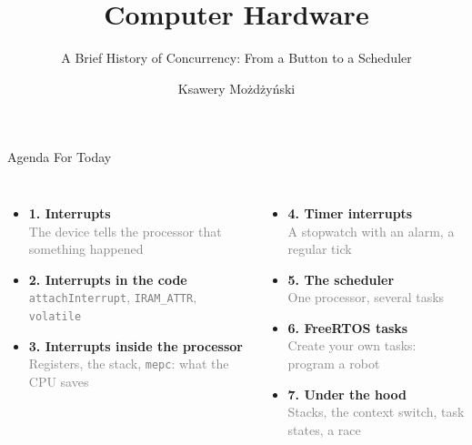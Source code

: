 \documentclass[aspectratio=169,10pt]{beamer}
\title{Computer Hardware}
\subtitle{A Brief History of Concurrency: From a Button to a Scheduler}
\author{Ksawery Możdżyński}
\date{}
\begin{document}
\begin{frame}
  \titlepage
\end{frame}

\begin{frame}{Agenda For Today}
  \begin{columns}[T,onlytextwidth]
      \large
      \begin{itemize}
        \item[\textcolor{DeepBlue}{\faBolt}] \textbf{1. Interrupts} \\
        \textcolor{gray}{\small The device tells the processor that something happened}
        \vspace{0.3cm}

        \item[\textcolor{DeepBlue}{\faCode}] \textbf{2. Interrupts in the code} \\
        \textcolor{gray}{\small \texttt{attachInterrupt}, \texttt{IRAM\_ATTR}, \texttt{volatile}}
        \vspace{0.3cm}

        \item[\textcolor{DeepBlue}{\faMemory}] \textbf{3. Interrupts inside the processor} \\
        \textcolor{gray}{\small Registers, the stack, \texttt{mepc}: what the CPU saves}
      \end{itemize}
      \large
      \begin{itemize}
        \item[\textcolor{DeepBlue}{\faStopwatch}] \textbf{4. Timer interrupts} \\
        \textcolor{gray}{\small A stopwatch with an alarm, a regular tick}
        \vspace{0.3cm}

        \item[\textcolor{DeepBlue}{\faRandom}] \textbf{5. The scheduler} \\
        \textcolor{gray}{\small One processor, several tasks}
        \vspace{0.3cm}

        \item[\textcolor{DeepBlue}{\faMicrochip}] \textbf{6. FreeRTOS tasks} \\
        \textcolor{gray}{\small Create your own tasks: program a robot}
        \vspace{0.3cm}

        \item[\textcolor{DeepBlue}{\faCogs}] \textbf{7. Under the hood} \\
        \textcolor{gray}{\small Stacks, the context switch, task states, a race}
      \end{itemize}
  \end{columns}
\end{frame}
\end{document}
